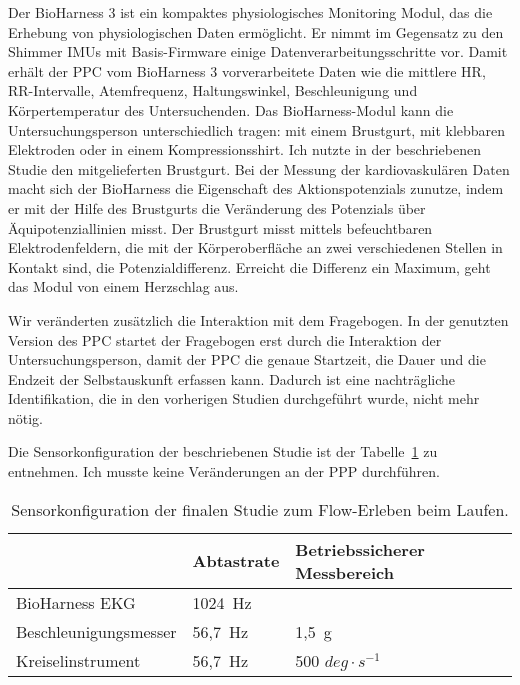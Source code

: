 Der BioHarness 3 ist ein kompaktes physiologisches Monitoring Modul, das die Erhebung von physiologischen Daten ermöglicht. Er nimmt im Gegensatz zu den Shimmer \acp{IMU} mit Basis-Firmware einige Datenverarbeitungsschritte vor. Damit erhält der \ac{PPC} vom BioHarness 3 vorverarbeitete Daten wie die mittlere \ac{HR}, RR-Intervalle, Atemfrequenz, Haltungswinkel, Beschleunigung und Körpertemperatur des Untersuchenden. Das BioHarness-Modul kann die Untersuchungsperson unterschiedlich tragen: mit einem Brustgurt, mit klebbaren Elektroden oder in einem Kompressionsshirt. Ich nutzte in der beschriebenen Studie den mitgelieferten Brustgurt. Bei der Messung der kardiovaskulären Daten macht sich der BioHarness die Eigenschaft des Aktionspotenzials zunutze, indem er mit der Hilfe des Brustgurts die Veränderung des Potenzials über Äquipotenziallinien misst. Der Brustgurt misst mittels befeuchtbaren Elektrodenfeldern, die mit der Körperoberfläche an zwei verschiedenen Stellen in Kontakt sind, die Potenzialdifferenz. Erreicht die Differenz ein Maximum, geht das Modul von einem Herzschlag aus. 

Wir veränderten zusätzlich die Interaktion mit dem Fragebogen. In der genutzten Version des \ac{PPC} startet der Fragebogen erst durch die Interaktion der Untersuchungsperson, damit der \ac{PPC} die genaue Startzeit, die Dauer und die Endzeit der Selbstauskunft erfassen kann. Dadurch ist eine nachträgliche Identifikation, die in den vorherigen Studien durchgeführt wurde, nicht mehr nötig. 

Die Sensorkonfiguration der beschriebenen Studie ist der Tabelle~\ref{tab:sensorkonfiguration_3} zu entnehmen. Ich musste keine Veränderungen an der \ac{PPP} durchführen. 
\begin{table}
	[!htb] \caption[Sensorkonfiguration der finalen Studie zum Flow-Erleben beim Laufen.]{Sensorkonfiguration der finalen Studie zum Flow-Erleben beim Laufen.} \label{tab:sensorkonfiguration_3} 
	\begin{tabularx}
		{ 
		\textwidth}{p{} p{} p{}} \toprule & Abtastrate & Betriebssicherer Messbereich \\
		\midrule BioHarness EKG & 1024~Hz & \\
		Beschleunigungsmesser & 56,7~Hz & 1,5~g \\
		Kreiselinstrument & 56,7~Hz & 500 $deg \cdot s^{-1}$ \\
		\bottomrule 
	\end{tabularx}
\end{table}

